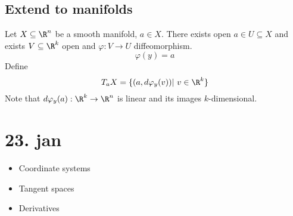 \subsection*{Extend to manifolds}
Let $X \subseteq \R^n  $ be a smooth manifold, $a\in X$. There exists open $a\in U \subseteq X$ and exists $V \subseteq \R^k $ open and $\varphi: V\to U$ diffeomorphism.
$$\varphi(y)=a$$
\newline Define
  $$T_aX=\{(a,d\varphi_y(v)) | v\in \R^k \}$$
Note that $d\varphi_y(a):\R^k \to \R^n$ is linear and its images $k$-dimensional.

\section{23. jan}
\begin{itemize}
  \item Coordinate systems
  \item Tangent spaces
  \item Derivatives
\end{itemize}

